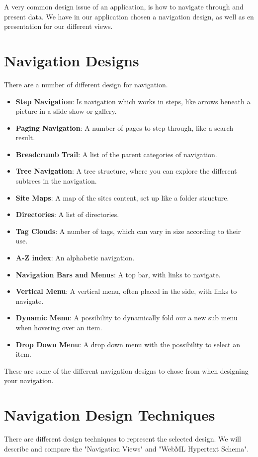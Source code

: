 A very common design issue of an application, is how to navigate through and present data.  We have in our application chosen a navigation design, as well as en presentation for our different views.

\section{Navigation Designs}
There are a number of different design for navigation.

\begin{itemize}
\item \textbf{Step Navigation}: Is navigation which works in steps, like arrows beneath a picture in a slide show or gallery.
\item \textbf{Paging Navigation}: A number of pages to step through, like a search result.
\item \textbf{Breadcrumb Trail}: A list of the parent categories of navigation.
\item \textbf{Tree Navigation}: A tree structure, where you can explore the different subtrees in the navigation.
\item \textbf{Site Maps}: A map of the sites content, set up like a folder structure.
\item \textbf{Directories}: A list of directories.
\item \textbf{Tag Clouds}: A number of tags, which can vary in size according to their use.
\item \textbf{A-Z index}: An alphabetic navigation.
\item \textbf{Navigation Bars and Menus}: A top bar, with links to navigate.
\item \textbf{Vertical Menu}: A vertical menu, often placed in the side, with links to navigate.
\item \textbf{Dynamic Menu}: A possibility to dynamically fold our a new sub menu when hovering over an item.
\item \textbf{Drop Down Menu}: A drop down menu with the possibility to select an item.
\end{itemize}

These are some of the different navigation designs to chose from when designing your navigation.

\section{Navigation Design Techniques}
There are different design techniques to represent the selected design.
We will describe and compare the "Navigation Views" and "WebML Hypertext Schema".

